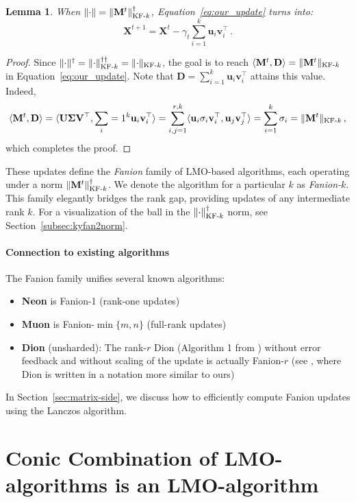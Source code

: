 \documentclass[a4paper,14pt,oneside]{extarticle}
\newtheorem{lemma}{Lemma}
\newcommand{\norm}[1]{\lVert #1\rVert}
\DeclarePairedDelimiter{\normkfk}{\|}{\|_{\text{KF-}k}}
\def\<#1,#2>{\langle #1,#2\rangle}
\newcommand{\vu}{\mathbf{u}}
\newcommand{\vv}{\mathbf{v}}
\newcommand{\mX}{\mathbf{X}}
\newcommand{\mM}{\mathbf{M}}
\newcommand{\mD}{\mathbf{D}}
\newcommand{\mU}{\mathbf{U}}
\newcommand{\mV}{\mathbf{V}}
\newcommand{\mSigma}{\mathbf{\Sigma}}
\newcommand{\sectionref}[1]{Section~\ref{#1}}
\newcommand{\equationref}[1]{Equation~\ref{#1}}
\begin{document}
\begin{lemma}\label{lemma:ky_fan_update}
  When $\norm{\cdot} = \normkfk{\mM^t}^\dagger$, \equationref{eq:our_update} turns into:
  \begin{equation}\label{eq:ky_fan_update}
    \mX^{t+1} = \mX^{t} - \gamma_t \sum_{i=1}^{k}\vu_i \vv_i^\top\,.
  \end{equation}
\end{lemma}

\begin{proof}
Since $\norm{\cdot}^\dagger = \normkfk{\cdot}^{\dagger\dagger} = \normkfk{\cdot}$, the goal is to reach $\<\mM^t, \mD> = \normkfk{\mM^t}$ in \equationref{eq:our_update}. Note that $\mD = \sum_{i=1}^{k} \vu_i \vv_i^\top$ attains this value. Indeed,
\[
\<\mM^t, \mD> =\<\mU \mSigma \mV^\top, \sum_{i=1}^{k} \vu_i \vv_i^\top> = \sum_{i,j=1}^{r, k}\<\vu_i \sigma_i \vv_i^\top, \vu_j \vv_j^\top> = \sum_{i=1}^{k}\sigma_i = \normkfk{\mM^t}\,,
\]
which completes the proof.
\end{proof}

These updates define the \emph{Fanion} family of LMO-based algorithms, each operating under a norm $\normkfk{\mM^t}^\dagger$. We denote the algorithm for a particular $k$ as \emph{Fanion-$k$}. This family elegantly bridges the rank gap, providing updates of any intermediate rank $k$. For a visualization of the ball in the $\normkfk{\cdot}^\dagger$ norm, see \sectionref{subsec:kyfan2norm}.

\paragraph{Connection to existing algorithms}
The Fanion family unifies several known algorithms:
\begin{itemize}
  \item \textbf{Neon} is Fanion-1 (rank-one updates)
  \item \textbf{Muon} is Fanion-$\min\{m,n\}$ (full-rank updates)
  \item \textbf{Dion} (unsharded): The rank-$r$ Dion (Algorithm 1 from \citep{ahn2025dion}) without error feedback and without scaling of the update is actually Fanion-$r$ (see \citep{pethick2025understandingdion}, where Dion is written in a notation more similar to ours)
\end{itemize}

In \sectionref{sec:matrix-side}, we discuss how to efficiently compute Fanion updates using the Lanczos algorithm.

\section{Conic Combination of LMO-algorithms is an LMO-algorithm}
\label{sec:conic_combo}
\end{document}
